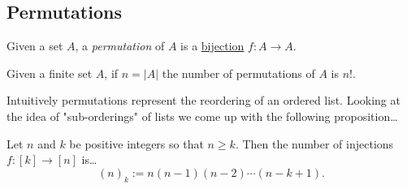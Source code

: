 \subsection{Permutations}\label{permutation}
Given a set $A$, a \emph{permutation} of $A$ is a \hyperref[bijection]{bijection} $f : A \rightarrow A$.

\begin{proposition}\label{factorial}
Given a finite set $A$, if $n = |A|$ the number of permutations of $A$ is $n!$.
\end{proposition}

Intuitively permutations represent the reordering of an ordered list\label{list}. Looking at the idea of "sub-orderings" of lists we come up with the following proposition\dots

\begin{proposition}[k-lists]\label{k-list}
Let $n$ and $k$ be positive integers so that $n \geq k$. Then the number of injections $f : [k] \rightarrow [n]$ is\dots
$$(n)_k := n(n-1)(n-2)\cdots(n-k+1).$$
\end{proposition}
